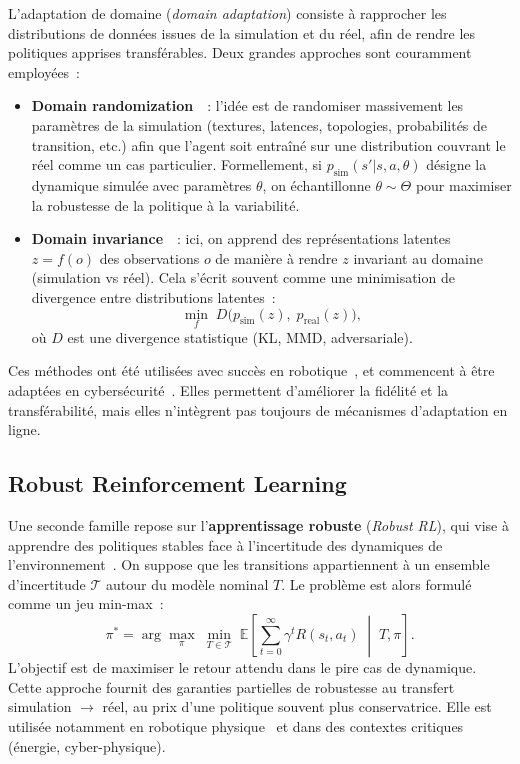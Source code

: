 \noindent
L’adaptation de domaine (\textit{domain adaptation}) consiste à rapprocher
les distributions de données issues de la simulation et du réel,
afin de rendre les politiques apprises transférables.
Deux grandes approches sont couramment employées~:

\begin{itemize}
  \item \textbf{Domain randomization}~\cite{tobin2017domain}~: l’idée est de
        randomiser massivement les paramètres de la simulation (textures, latences, topologies,
        probabilités de transition, etc.) afin que l’agent soit entraîné sur une distribution
        couvrant le réel comme un cas particulier. Formellement, si
        $p_\text{sim}(s'|s,a,\theta)$ désigne la dynamique simulée
        avec paramètres $\theta$, on échantillonne $\theta \sim \Theta$ pour
        maximiser la robustesse de la politique à la variabilité.
  \item \textbf{Domain invariance}~\cite{ganin2016domain}~: ici, on apprend
        des représentations latentes $z = f(o)$ des observations $o$
        de manière à rendre $z$ invariant au domaine
        (simulation vs réel). Cela s’écrit souvent comme une minimisation
        de divergence entre distributions latentes~:
        \[
          \min_f \; D\big(p_\text{sim}(z), \; p_\text{real}(z)\big),
        \]
        où $D$ est une divergence statistique (KL, MMD, adversariale).
\end{itemize}

\noindent
Ces méthodes ont été utilisées avec succès en robotique~\cite{tobin2017domain, peng2018sim},
et commencent à être adaptées en cybersécurité~\cite{Standen2021}.
Elles permettent d’améliorer la fidélité et la transférabilité,
mais elles n’intègrent pas toujours de mécanismes d’adaptation en ligne.

\subsection{Robust Reinforcement Learning}

\noindent
Une seconde famille repose sur l’\textbf{apprentissage robuste}
(\textit{Robust RL}), qui vise à apprendre des politiques stables
face à l’incertitude des dynamiques de l’environnement~\cite{pinto2017robust}.
On suppose que les transitions appartiennent à un ensemble d’incertitude
$\mathcal{T}$ autour du modèle nominal $T$.
Le problème est alors formulé comme un jeu min-max~:
\[
  \pi^* = \arg\max_\pi \; \min_{T \in \mathcal{T}}
  \; \mathbb{E}\!\left[\sum_{t=0}^\infty \gamma^t R(s_t,a_t) \;\middle|\; T, \pi\right].
\]
L’objectif est de maximiser le retour attendu
dans le pire cas de dynamique.
Cette approche fournit des garanties partielles de robustesse
au transfert simulation $\rightarrow$ réel,
au prix d’une politique souvent plus conservatrice.
Elle est utilisée notamment en robotique physique~\cite{pinto2017robust}
et dans des contextes critiques (énergie, cyber-physique).


